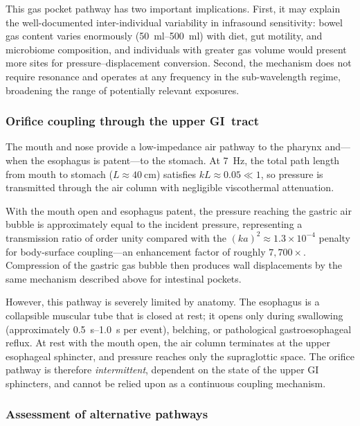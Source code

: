 This gas pocket pathway has two important implications.  First, it may
explain the well-documented inter-individual variability in infrasound
sensitivity: bowel gas content varies enormously
(\SIrange{50}{500}{\milli\litre}) with diet, gut motility, and
microbiome composition, and individuals with greater gas volume would present
more sites for pressure--displacement conversion.  Second, the mechanism does
not require resonance and operates at any frequency in the sub-wavelength
regime, broadening the range of potentially relevant exposures.

\subsubsection{Orifice coupling through the upper GI~tract}

The mouth and nose provide a low-impedance air pathway to the pharynx
and---when the esophagus is patent---to the stomach.  At \SI{7}{\hertz},
the total path length from mouth to stomach
($L \approx \SI{40}{\centi\metre}$) satisfies $kL \approx 0.05 \ll 1$, so
pressure is transmitted through the air column with negligible
viscothermal attenuation.

With the mouth open and esophagus patent, the pressure reaching the gastric
air bubble is approximately equal to the incident pressure, representing a
transmission ratio of order unity compared with the $(ka)^2 \approx 1.3
\times 10^{-4}$ penalty for body-surface coupling---an enhancement factor
of roughly $7{,}700\times$.  Compression of the gastric gas bubble then
produces wall displacements by the same mechanism described above for
intestinal pockets.

However, this pathway is severely limited by anatomy.  The esophagus is a
collapsible muscular tube that is closed at rest; it opens only during
swallowing (approximately \SIrange{0.5}{1.0}{\second} per event), belching,
or pathological gastroesophageal reflux.  At rest with the mouth open, the
air column terminates at the upper esophageal sphincter, and pressure reaches
only the supraglottic space.  The orifice pathway is therefore
\emph{intermittent}, dependent on the state of the upper GI sphincters, and
cannot be relied upon as a continuous coupling mechanism.

\subsubsection{Assessment of alternative pathways}

